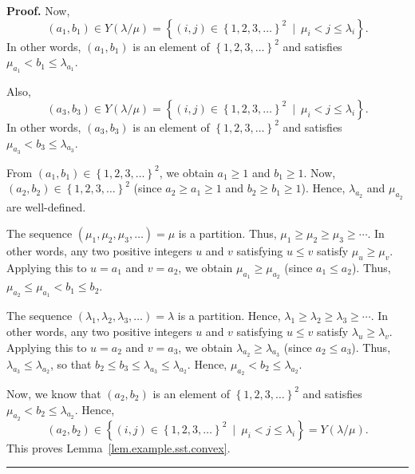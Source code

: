 \documentclass[numbers=enddot,12pt,final,onecolumn,notitlepage,abstracton]{scrartcl}
\theoremstyle{definition}
\newenvironment{proof}[1][Proof]{\noindent\textbf{#1.} }{\ \rule{0.5em}{0.5em}}
\newenvironment{verlong}{}{}
\begin{document}
\begin{verlong}
\begin{footnotesize}
\begin{proof}
Now,
\[
\left(  a_{1},b_{1}\right)  \in Y\left(  \lambda/\mu\right)  =\left\{  \left(
i,j\right)  \in\left\{  1,2,3,\ldots\right\}  ^{2}\ \mid\ \mu_{i}<j\leq
\lambda_{i}\right\}  .
\]
In other words, $\left(  a_{1},b_{1}\right)  $ is an element of $\left\{
1,2,3,\ldots\right\}  ^{2}$ and satisfies $\mu_{a_{1}}<b_{1}\leq\lambda
_{a_{1}}$.

Also,
\[
\left(  a_{3},b_{3}\right)  \in Y\left(  \lambda/\mu\right)  =\left\{  \left(
i,j\right)  \in\left\{  1,2,3,\ldots\right\}  ^{2}\ \mid\ \mu_{i}<j\leq
\lambda_{i}\right\}  .
\]
In other words, $\left(  a_{3},b_{3}\right)  $ is an element of $\left\{
1,2,3,\ldots\right\}  ^{2}$ and satisfies $\mu_{a_{3}}<b_{3}\leq\lambda
_{a_{3}}$.

From $\left(  a_{1},b_{1}\right)  \in\left\{  1,2,3,\ldots\right\}  ^{2}$, we
obtain $a_{1} \geq1$ and $b_{1} \geq1$. Now, $\left(  a_{2},b_{2}\right)  \in\left\{
1,2,3,\ldots\right\}  ^{2}$ (since $a_{2} \geq a_{1} \geq1$ and $b_{2} \geq
b_{1} \geq1$). Hence, $\lambda_{a_{2}}$ and $\mu_{a_{2}}$ are well-defined.

The sequence $\left(  \mu_{1},\mu_{2},\mu_{3},\ldots\right)  =\mu$ is a
partition. Thus, $\mu_{1}\geq\mu_{2}\geq\mu_{3}\geq\cdots$. In other words,
any two positive integers $u$ and $v$ satisfying $u\leq v$ satisfy $\mu
_{u}\geq\mu_{v}$. Applying this to $u=a_{1}$ and $v=a_{2}$, we obtain
$\mu_{a_{1}}\geq\mu_{a_{2}}$ (since $a_{1}\leq a_{2}$). Thus, $\mu_{a_{2}}%
\leq\mu_{a_{1}}<b_{1}\leq b_{2}$.

The sequence $\left(  \lambda_{1},\lambda_{2},\lambda_{3},\ldots\right)
=\lambda$ is a partition. Hence, $\lambda_{1}\geq\lambda_{2}\geq\lambda
_{3}\geq\cdots$. In other words, any two positive integers $u$ and $v$
satisfying $u\leq v$ satisfy $\lambda_{u}\geq\lambda_{v}$. Applying this to
$u=a_{2}$ and $v=a_{3}$, we obtain $\lambda_{a_{2}}\geq\lambda_{a_{3}}$ (since
$a_{2}\leq a_{3}$). Thus, $\lambda_{a_{3}}\leq\lambda_{a_{2}}$, so that
$b_{2}\leq b_{3}\leq\lambda_{a_{3}}\leq\lambda_{a_{2}}$. Hence, $\mu_{a_{2}%
}<b_{2}\leq\lambda_{a_{2}}$.

Now, we know that $\left(  a_{2},b_{2}\right)  $ is an element of $\left\{
1,2,3,\ldots\right\}  ^{2}$ and satisfies $\mu_{a_{2}}<b_{2}\leq\lambda
_{a_{2}}$. Hence,
\[
\left(  a_{2},b_{2}\right)  \in\left\{  \left(  i,j\right)  \in\left\{
1,2,3,\ldots\right\}  ^{2}\ \mid\ \mu_{i}<j\leq\lambda_{i}\right\}  =Y\left(
\lambda/\mu\right)  .
\]
This proves Lemma~\ref{lem.example.sst.convex}.
\end{proof}


\end{footnotesize}
\end{verlong}
\end{document}
